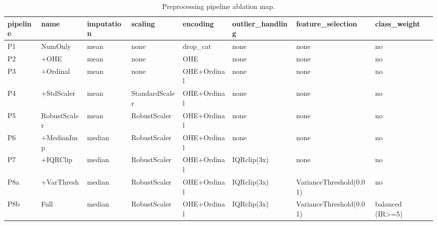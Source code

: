 \begin{table}
\caption{Preprocessing pipeline ablation map.}
\label{tab:pipelines}
\begin{tabular}{llllllll}
\toprule
pipeline & name & imputation & scaling & encoding & outlier\_handling & feature\_selection & class\_weight \\
\midrule
P1 & NumOnly & mean & none & drop\_cat & none & none & no \\
P2 & +OHE & mean & none & OHE & none & none & no \\
P3 & +Ordinal & mean & none & OHE+Ordinal & none & none & no \\
P4 & +StdScaler & mean & StandardScaler & OHE+Ordinal & none & none & no \\
P5 & RobustScaler & mean & RobustScaler & OHE+Ordinal & none & none & no \\
P6 & +MedianImp & median & RobustScaler & OHE+Ordinal & none & none & no \\
P7 & +IQRClip & median & RobustScaler & OHE+Ordinal & IQRclip(3x) & none & no \\
P8a & +VarThresh & median & RobustScaler & OHE+Ordinal & IQRclip(3x) & VarianceThreshold(0.01) & no \\
P8b & Full & median & RobustScaler & OHE+Ordinal & IQRclip(3x) & VarianceThreshold(0.01) & balanced (IR>=5) \\
\bottomrule
\end{tabular}
\end{table}
